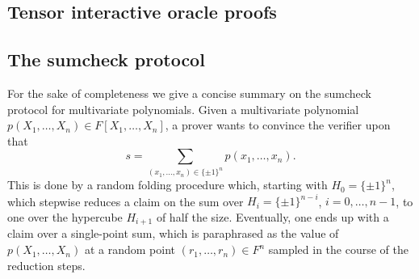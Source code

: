 \documentclass[11pt]{article}
\theoremstyle{definition}
\theoremstyle{remark}
\begin{document}
\subsection{Tensor interactive oracle proofs}

\subsection{The sumcheck protocol}

For the sake of completeness we give a concise summary on the sumcheck protocol \cite{sumcheck} for multivariate polynomials.
Given a multivariate polynomial $p(X_1,\ldots, X_n)\in F[X_1,\ldots, X_n]$, a prover wants to convince the verifier upon that
\begin{equation*}
s = \sum_{(x_1,\ldots, x_n) \in \{\pm 1\}^n} p(x_1, \ldots, x_n).
\end{equation*}
This is done by a random folding procedure which, starting with $H_0=\{\pm 1\}^n$, which stepwise reduces a claim on the sum over $H_i = \{\pm 1\}^{n-i}$, $i=0,\ldots, n-1$, to one over the hypercube $H_{i+1}$ of half the size. 
Eventually, one ends up with a claim over a single-point sum, which is paraphrased as the value of $p(X_1,\ldots, X_n)$ at a random point $(r_1,\ldots, r_n)\in F^n$ sampled in the course of the reduction steps.

 
\end{document}
